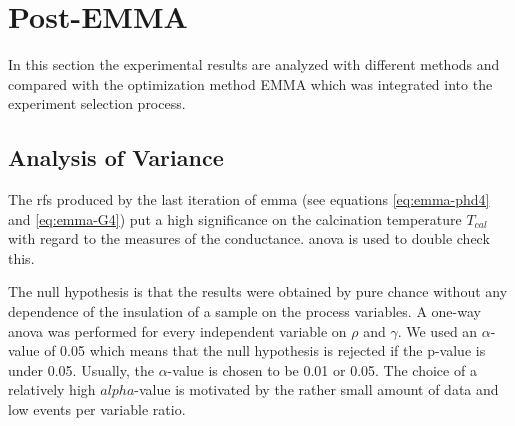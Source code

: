 \section{Post-EMMA}
\label{sec:res-post-emma}
In this section the experimental results are analyzed with different methods and compared 
with the optimization method EMMA which was integrated into the experiment selection process. 
\subsection{Analysis of Variance}
\label{sec:res-anova}
The \gls{rf}s produced by the last iteration of \gls{emma} (see equations \ref{eq:emma-phd4} and \ref{eq:emma-G4}) put a high significance
on the calcination temperature $T_{cal}$ with regard to the 
measures of the conductance. 
\Gls{anova} is used to double check this. 

The null hypothesis is that the results were obtained by pure chance without any dependence of the insulation of a sample on the process variables.
A one-way \gls{anova} was performed for every independent variable on $\rho$ and $\gamma$. 
We used an $\alpha$-value of 0.05 which means that 
the null hypothesis is rejected if the p-value is under 0.05. 
Usually, the $\alpha$-value is chosen to be 0.01 or 0.05\cite{hoffman2020concept,sellke2001pvalues}.
The choice of a relatively high $alpha$-value is motivated by the rather small amount of data and low events per variable ratio.
%

